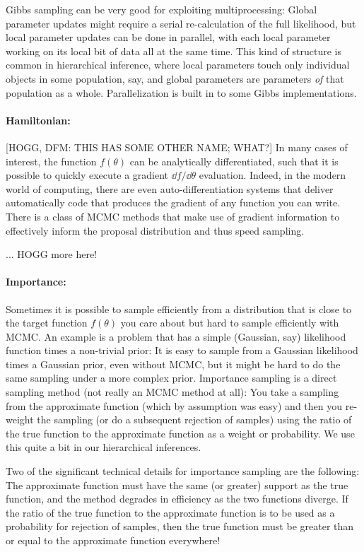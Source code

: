 \documentclass[12pt,twoside,pdftex]{article}
\newcommand{\pars}{\theta}
\begin{document}
Gibbs sampling can be very good for exploiting multiprocessing:
Global parameter updates might require a serial re-calculation of the
full likelihood, but local parameter updates can be done in parallel,
with each local parameter working on its local bit of data all at the
same time.
This kind of structure is common in hierarchical inference, where
local parameters touch only individual objects in some population,
say, and global parameters are parameters \emph{of} that population as
a whole.
Parallelization is built in to some Gibbs implementations.

\paragraph{Hamiltonian:}
[HOGG, DFM: THIS HAS SOME OTHER NAME; WHAT?]
In many cases of interest, the function $f(\pars)$ can be analytically
differentiated, such that it is possible to quickly execute a gradient
$\dd f/\dd\pars$ evaluation.
Indeed, in the modern world of computing, there are even
auto-differentiation systems that deliver automatically code that
produces the gradient of any function you can write.
There is a class of MCMC methods that make use of gradient information
to effectively inform the proposal distribution and thus speed sampling.

... HOGG more here!

\paragraph{Importance:}
Sometimes it is possible to sample efficiently from a distribution
that is close to the target function $f(\pars)$ you care about but
hard to sample efficiently with MCMC.
An example is a problem that has a simple (Gaussian, say) likelihood
function times a non-trivial prior:
It is easy to sample from a Gaussian likelihood times a Gaussian
prior, even without MCMC, but it might be hard to do the same sampling
under a more complex prior.
Importance sampling is a direct sampling method (not really an MCMC
method at all):
You take a sampling from the approximate function (which by assumption
was easy) and then you re-weight the sampling (or do a subsequent
rejection of samples) using the ratio of the true function to the
approximate function as a weight or probability.
We use this quite a bit in our hierarchical inferences.

Two of the significant technical details for importance sampling are the
following:
The approximate function must have the same (or greater) support as
the true function, and the method degrades in efficiency as the two
functions diverge.
If the ratio of the true function to the approximate function is to be
used as a probability for rejection of samples, then the true function
must be greater than or equal to the approximate function everywhere!
\end{document}
